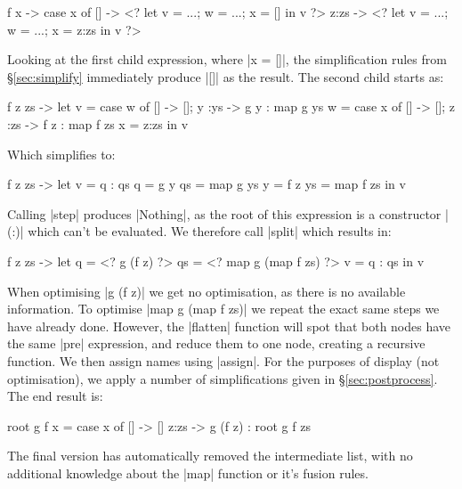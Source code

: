 \documentclass[draft]{sigplanconf}
\begin{document}
\begin{code}
\g f x -> case  x of
                []    -> <? let v = ...; w = ...; x = []    in v ?>
                z:zs  -> <? let v = ...; w = ...; x = z:zs  in v ?>
\end{code}

Looking at the first child expression, where |x = []|, the simplification rules from \S\ref{sec:simplify} immediately produce |[]| as the result. The second child starts as:

\begin{code}
\g f z zs ->
    let  v  = case  w  of [] -> []; y  :ys  -> g  y  : map g  ys
         w  = case  x  of [] -> []; z  :zs  -> f  z  : map f  zs
         x  = z:zs
    in   v
\end{code}

\noindent Which simplifies to:

\begin{code}
\g f z zs ->  let  v   = q : qs
                   q   = g y
                   qs  = map g ys
                   y   = f z
                   ys  = map f zs
              in   v
\end{code}

Calling |step| produces |Nothing|, as the root of this expression is a constructor |(:)| which can't be evaluated. We therefore call |split| which results in:

\begin{code}
\g f z zs ->  let  q   = <? g (f z) ?>
                   qs  = <? map g (map f zs) ?>
                   v   = q : qs
              in   v
\end{code}

When optimising |g (f z)| we get no optimisation, as there is no available information. To optimise |map g (map f zs)| we repeat the exact same steps we have already done. However, the |flatten| function will spot that both nodes have the same |pre| expression, and reduce them to one node, creating a recursive function. We then assign names using |assign|. For the purposes of display (not optimisation), we apply a number of simplifications given in \S\ref{sec:postprocess}. The end result is:

\begin{code}
root g f x = case  x of
                   []    -> []
                   z:zs  -> g (f z) : root g f zs
\end{code}

The final version has automatically removed the intermediate list, with no additional knowledge about the |map| function or it's fusion rules.
\end{document}
